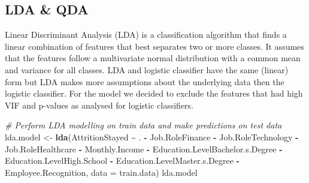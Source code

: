 \documentclass[
  10pt,
  paper=a4,
  ,captions=tableheading
]{scrartcl}
\newenvironment{Shaded}{\begin{snugshade}}{\end{snugshade}}
\newcommand{\AttributeTok}[1]{\textcolor[rgb]{0.13,0.29,0.53}{#1}}
\newcommand{\CommentTok}[1]{\textcolor[rgb]{0.56,0.35,0.01}{\textit{#1}}}
\newcommand{\FunctionTok}[1]{\textcolor[rgb]{0.13,0.29,0.53}{\textbf{#1}}}
\newcommand{\NormalTok}[1]{#1}
\newcommand{\OtherTok}[1]{\textcolor[rgb]{0.56,0.35,0.01}{#1}}
\newcommand{\SpecialCharTok}[1]{\textcolor[rgb]{0.81,0.36,0.00}{\textbf{#1}}}
\begin{document}
\subsection{LDA \& QDA}\label{lda-qda}

Linear Discriminant Analysis (LDA) is a classification algorithm that
finds a linear combination of features that best separates two or more
classes. It assumes that the features follow a multivariate normal
distribution with a common mean and variance for all classes. LDA and
logistic classifier have the same (linear) form but LDA makes more
assumptions about the underlying data then the logistic classifier. For
the model we decided to exclude the features that had high VIF and
p-values as analysed for logistic classifiers.

\small

\begin{Shaded}
\begin{Highlighting}[]
\CommentTok{\# Perform LDA modelling on train data and make predictions on test data}
\NormalTok{lda.model }\OtherTok{\textless{}{-}} \FunctionTok{lda}\NormalTok{(AttritionStayed }\SpecialCharTok{\textasciitilde{}}\NormalTok{ . }\SpecialCharTok{{-}}\NormalTok{ Job.RoleFinance }\SpecialCharTok{{-}}\NormalTok{ Job.RoleTechnology }\SpecialCharTok{{-}}
\NormalTok{    Job.RoleHealthcare }\SpecialCharTok{{-}}\NormalTok{ Monthly.Income }\SpecialCharTok{{-}}\NormalTok{ Education.LevelBachelor.s.Degree }\SpecialCharTok{{-}}
\NormalTok{    Education.LevelHigh.School }\SpecialCharTok{{-}}\NormalTok{ Education.LevelMaster.s.Degree }\SpecialCharTok{{-}}\NormalTok{ Employee.Recognition,}
    \AttributeTok{data =}\NormalTok{ train.data)}
\NormalTok{lda.model}
\end{Highlighting}
\end{Shaded}
\end{document}
